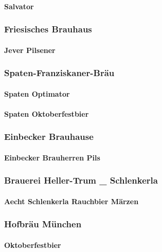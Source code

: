 \documentclass[11pt]{article}
\begin{document}
\paragraph{Salvator}
\label{sec:orge290513}
\subsubsection{Friesisches Brauhaus}
\label{sec:org7cb1e0c}
\paragraph{Jever Pilsener}
\label{sec:orgaaef2f4}
\subsubsection{Spaten-Franziskaner-Bräu}
\label{sec:orgae8f11d}
\paragraph{Spaten Optimator}
\label{sec:org7dd38f9}
\paragraph{Spaten Oktoberfestbier}
\label{sec:orgb308259}
\subsubsection{Einbecker Brauhause}
\label{sec:org97aebc6}
\paragraph{Einbecker Brauherren Pils}
\label{sec:orge206ca9}
\subsubsection{Brauerei Heller-Trum \_ Schlenkerla}
\label{sec:org45d1a4a}
\paragraph{Aecht Schlenkerla Rauchbier Märzen}
\label{sec:orga1a70b7}
\subsubsection{Hofbräu München}
\label{sec:orgc9a3c4e}
\paragraph{Oktoberfestbier}
\label{sec:org1318a98}
\end{document}
